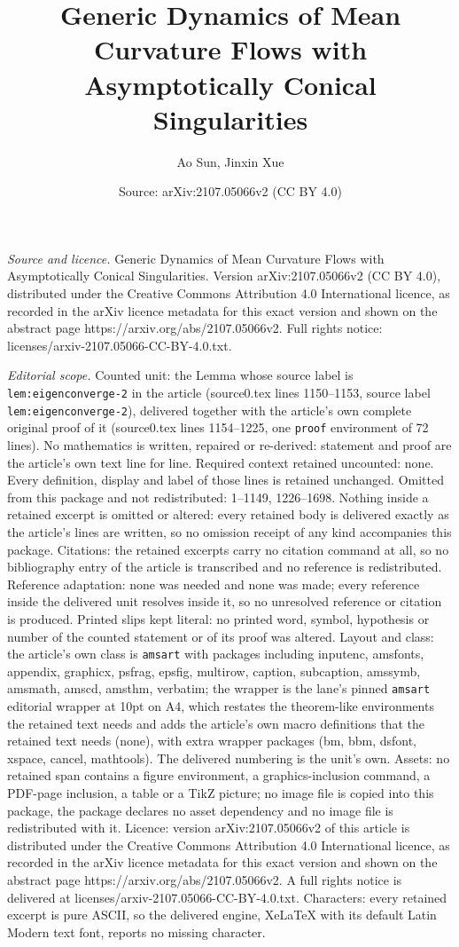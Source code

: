 \documentclass[10pt,a4paper]{amsart}
\title[Generic Dynamics of Mean Curvature Flows with Asymptotically]{Generic Dynamics of Mean Curvature Flows with Asymptotically Conical Singularities}
\author{Ao Sun, Jinxin Xue}
\date{Source: arXiv:2107.05066v2 (CC BY 4.0)}
\begin{document}
\maketitle

\noindent\emph{Source and licence.} Generic Dynamics of Mean Curvature Flows with Asymptotically Conical Singularities. Version arXiv:2107.05066v2 (CC BY 4.0), distributed under the Creative Commons Attribution 4.0 International licence, as recorded in the arXiv licence metadata for this exact version and shown on the abstract page https://arxiv.org/abs/2107.05066v2. Full rights notice: licenses/arxiv-2107.05066-CC-BY-4.0.txt.\par\smallskip

\noindent\textit{Editorial scope.} Counted unit: the Lemma whose source label is \texttt{lem:eigenconverge-2} in the article (source0.tex lines 1150--1153, source label \texttt{lem:eigenconverge-2}), delivered together with the article's own complete original proof of it (source0.tex lines 1154--1225, one \texttt{proof} environment of 72 lines). No mathematics is written, repaired or re-derived: statement and proof are the article's own text line for line. Required context retained uncounted: none. Every definition, display and label of those lines is retained unchanged. Omitted from this package and not redistributed: 1--1149, 1226--1698. Nothing inside a retained excerpt is omitted or altered: every retained body is delivered exactly as the article's lines are written, so no omission receipt of any kind accompanies this package. Citations: the retained excerpts carry no citation command at all, so no bibliography entry of the article is transcribed and no reference is redistributed. Reference adaptation: none was needed and none was made; every reference inside the delivered unit resolves inside it, so no unresolved reference or citation is produced. Printed slips kept literal: no printed word, symbol, hypothesis or number of the counted statement or of its proof was altered. Layout and class: the article's own class is \texttt{amsart} with packages including inputenc, amsfonts, appendix, graphicx, psfrag, epsfig, multirow, caption, subcaption, amssymb, amsmath, amscd, amsthm, verbatim; the wrapper is the lane's pinned \texttt{amsart} editorial wrapper at 10pt on A4, which restates the theorem-like environments the retained text needs and adds the article's own macro definitions that the retained text needs (none), with extra wrapper packages (bm, bbm, dsfont, xspace, cancel, mathtools). The delivered numbering is the unit's own. Assets: no retained span contains a figure environment, a graphics-inclusion command, a PDF-page inclusion, a table or a TikZ picture; no image file is copied into this package, the package declares no asset dependency and no image file is redistributed with it. Licence: version arXiv:2107.05066v2 of this article is distributed under the Creative Commons Attribution 4.0 International licence, as recorded in the arXiv licence metadata for this exact version and shown on the abstract page https://arxiv.org/abs/2107.05066v2. A full rights notice is delivered at licenses/arxiv-2107.05066-CC-BY-4.0.txt. Characters: every retained excerpt is pure ASCII, so the delivered engine, XeLaTeX with its default Latin Modern text font, reports no missing character.
\end{document}
